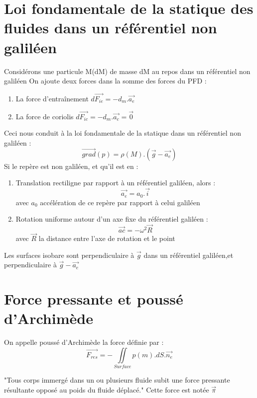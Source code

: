 \section{Loi fondamentale de la statique des fluides dans un référentiel non galiléen}
Considérons une particule M(dM) de masse dM au repos dans un référentiel non galiléen
On ajoute deux forces dans la somme des forces du PFD : \\
\begin{enumerate}
 \item La force d'entraînement $d\overrightarrow{F_{ie}} = -d_m.\overrightarrow{a_e}$ 
 \item La force de coriolis $d\overrightarrow{F_{ic}} = -d_m.\overrightarrow{a_c}=\overrightarrow{0}$ \\
\end{enumerate}
Ceci nous conduit à la loi fondamentale de la statique dans un référentiel non galiléen :
$$\overrightarrow{grad}(p) = \rho(M).(\overrightarrow{g}-\overrightarrow{a_e})$$
Si le repère est non galiléen, et qu'il est en : \\
\begin{enumerate}
 \item Translation rectiligne par rapport à un référentiel galiléen, alors :\\
	$$\overrightarrow{a_e}=a_0.\overrightarrow{i}$$
  avec $a_0$ accélération de ce repère par rapport à celui galiléen
 \item Rotation uniforme autour d'un axe fixe du référentiel galiléen :
$$\overrightarrow{ac} = -\omega^{2}\overrightarrow{R}$$
avec $\overrightarrow{R}$ la distance entre l'axe de rotation et le point \\
\end{enumerate}
Les surfaces isobare sont perpendiculaire à $\overrightarrow{g}$ dans un référentiel galiléen,et perpendiculaire à $\overrightarrow{g}-\overrightarrow{a_e}$
\section{Force pressante et poussé d'Archimède}
\begin{de}
On appelle poussé d'Archimède la force définie par : 
$$\overrightarrow{F_{res}} = -\underset{Surface}\iint p(m).dS.\overrightarrow{n_e}$$
\end{de}
\begin{theo}
 "Tous corps immergé dans un ou plusieurs fluide subit une force pressante résultante opposé au poids du fluide déplacé."
Cette force est notée $\overrightarrow{\pi}$
\end{theo}

